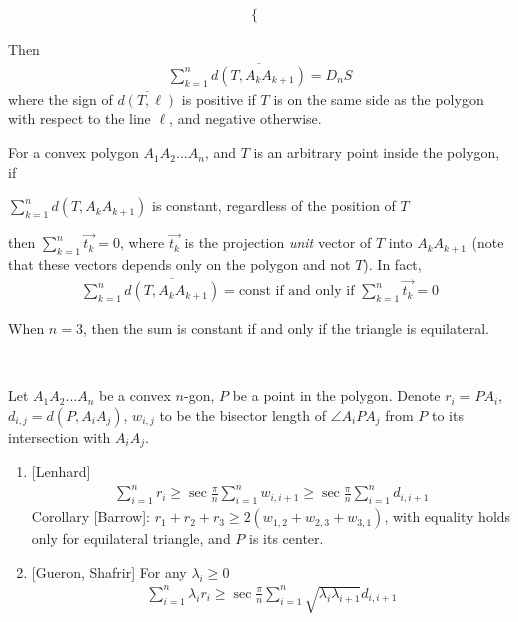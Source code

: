 \documentclass{treatise}
\begin{document}
\begin{shaded}
\begin{theorem}
\begin{enumerate}
\begin{align*}
\begin{cases}
	\end{cases}
	\end{align*}
\end{enumerate}
Then
\begin{align*}
\sum_{k = 1}^n \overline{d(T, A_k A_{k + 1})} = D_n S
\end{align*}
where the sign of $\overline{d(T, \ell)}$ is positive if $T$ is on the same side as the polygon with respect to the line $\ell$, and negative otherwise.
\end{theorem}
\begin{theorem}
For a convex polygon $A_1 A_2 \hdots A_n$, and $T$ is an arbitrary point inside the polygon, if
\begin{center}
$\sum_{k = 1}^n d(T, A_k A_{k + 1})$ is constant, regardless of the position of $T$
\end{center}
then $\sum_{k = 1}^n \vec{t_k} = 0$, where $\vec{t_k}$ is the projection \emph{unit} vector of $T$ into $A_k A_{k + 1}$ (note that these vectors depends only on the polygon and not $T$). In fact,
\begin{align*}
\sum_{k = 1}^n \overline{d(T, A_k A_{k + 1})} = \mbox{const if and only if } \sum_{k = 1}^n \vec{t_k} = 0
\end{align*}
\end{theorem}
\begin{corollary}
When $n = 3$, then the sum is constant if and only if the triangle is equilateral.
\end{corollary}
\ \\
\begin{theorem}
Let $A_1 A_2 \hdots A_n$ be a convex $n$-gon, $P$ be a point in the polygon. Denote $r_i = PA_i$, $d_{i, j} = d(P, A_i A_j)$, $w_{i, j}$ to be the bisector length of $\angle A_i P A_j$ from $P$ to its intersection with $A_i A_j$.
\begin{enumerate}
	\item {[Lenhard]}
	\begin{align*}
	\sum_{i = 1}^n r_i \geq \sec \frac{\pi}{n} \sum_{i = 1}^n w_{i, i + 1} \geq \sec \frac{\pi}{n} \sum_{i = 1}^n d_{i, i + 1}
	\end{align*}
	Corollary [Barrow]: $r_1 + r_2 + r_3 \geq 2 (w_{1, 2} + w_{2, 3} + w_{3, 1})$, with equality holds only for equilateral triangle, and $P$ is its center.
	\item {[Gueron, Shafrir]} For any $\lambda_i \geq 0$
	\begin{align*}
	\sum_{i = 1}^n \lambda_i r_i \geq \sec \frac{\pi}{n} \sum_{i = 1}^n \sqrt{\lambda_i \lambda_{i + 1}} d_{i, i + 1}

\end{align*}
\end{enumerate}
\end{theorem}
\end{shaded}
\end{document}
